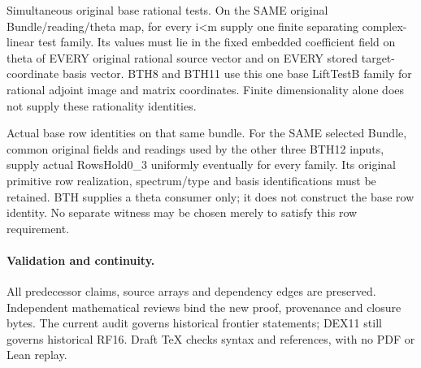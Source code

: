 \begin{description}[style=nextline]
\item[32. BASE\_THETA\_RATIONAL\_TESTS --- C] Simultaneous original base rational tests. On the SAME original Bundle/\allowbreak{}reading/\allowbreak{}theta map, for every i<m supply one finite separating complex-linear test family. Its values must lie in the fixed embedded coefficient field on theta of EVERY original rational source vector and on EVERY stored target-coordinate basis vector. BTH8 and BTH11 use this one base LiftTestB family for rational adjoint image and matrix coordinates. Finite dimensionality alone does not supply these rationality identities.

\item[33. SLR\_BASE\_ROWS\_PRODUCER --- C] Actual base row identities on that same bundle. For the SAME selected Bundle, common original fields and readings used by the other three BTH12 inputs, supply actual RowsHold0\_3 uniformly eventually for every family. Its original primitive row realization, spectrum/\allowbreak{}type and basis identifications must be retained. BTH supplies a theta consumer only; it does not construct the base row identity. No separate witness may be chosen merely to satisfy this row requirement.

\end{description}

\paragraph{Validation and continuity.}
All predecessor claims, source arrays and dependency edges are
preserved. Independent mathematical reviews bind the new proof,
provenance and closure bytes. The current audit governs historical
frontier statements; DEX11 still governs historical RF16.
Draft TeX checks syntax and references, with no PDF or Lean replay.
